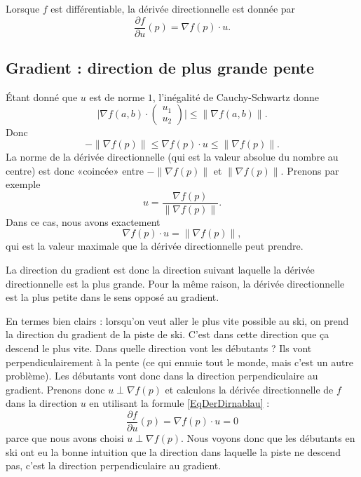 Lorsque $f$ est différentiable, la dérivée directionnelle est donnée par
\begin{equation}        \label{EqDerDirnablau}
    \frac{ \partial f }{ \partial u }(p)=\nabla f(p)\cdot u.
\end{equation}

\subsection{Gradient : direction de plus grande pente}

Étant donné que $u$ est de norme $1$, l'inégalité de Cauchy-Schwartz donne
\begin{equation}
    \big| \nabla f(a,b)\cdot \begin{pmatrix}
        u_1    \\ 
        u_2    
    \end{pmatrix}\big|\leq \| \nabla f(a,b) \|.
\end{equation}
Donc
\begin{equation}
    -\| \nabla f(p) \|\leq \nabla f(p)\cdot u\leq\| \nabla f(p) \|.
\end{equation}
La norme de la dérivée directionnelle (qui est la valeur absolue du nombre au centre) est donc «coincée» entre $-\| \nabla f(p) \|$ et $\| \nabla f(p) \|$. Prenons par exemple
\begin{equation}
    u=\frac{ \nabla f(p) }{ \| \nabla f(p) \| }.
\end{equation}
Dans ce cas, nous avons exactement
\begin{equation}
    \nabla f(p)\cdot u=\| \nabla f(p) \|,
\end{equation}
qui est la valeur maximale que la dérivée directionnelle peut prendre.

La direction du gradient est donc la direction suivant laquelle la dérivée directionnelle est la plus grande. Pour la même raison, la dérivée directionnelle est la plus petite dans le sens opposé au gradient.

En termes bien clairs : lorsqu'on veut aller le plus vite possible au ski, on prend la direction du gradient de la piste de ski. C'est dans cette direction que ça descend le plus vite. Dans quelle direction vont les débutants ? Ils vont perpendiculairement à la pente (ce qui ennuie tout le monde, mais c'est un autre problème). Les débutants vont donc dans la direction perpendiculaire au gradient. Prenons donc $u\perp \nabla f(p)$ et calculons la dérivée directionnelle de $f$ dans la direction $u$ en utilisant la formule \ref{EqDerDirnablau} :
\begin{equation}
    \frac{ \partial f }{ \partial u }(p)=\nabla f(p)\cdot u=0
\end{equation}
parce que nous avons choisi $u\perp \nabla f(p)$. Nous voyons donc que les débutants en ski ont eu la bonne intuition que la direction dans laquelle la piste ne descend pas, c'est la direction perpendiculaire au gradient.

